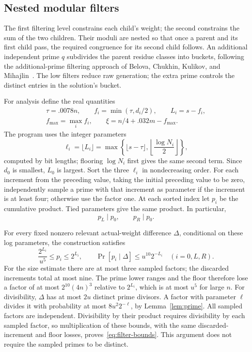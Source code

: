 \subsection{Nested modular filters}

The first filtering level constrains each child's weight; the second
constrains the sum of the two children. Their moduli are nested so that
once a parent and its first child pass, the required congruence for its
second child follows. An additional independent prime $q$ subdivides
the parent residue classes into buckets, following the additional-prime
filtering approach of Belova, Chukhin, Kulikov, and
Mihajlin~\cite[full version, Sections~1.2.3 and~4.1]{BCKM24}.
The low filters reduce raw
generation; the extra prime controls the distinct entries in the
solution's bucket.

For analysis define the real quantities
\begin{equation}\label{eq:filter-scales}
\begin{gathered}
 \tau=.0078n,\qquad f_i=\min(\tau,d_i/2),\qquad L_i=s-f_i,\\
 f_{\max}=\max_i f_i,\qquad \xi=n/4+.032m-f_{\max}.
\end{gathered}
\end{equation}
The program uses the integer parameters
\[
 \ell_i=\lfloor L_i\rfloor
 =\max\left\{\lfloor s-\tau\rfloor,
              \left\lfloor\frac{\log N_i}{2}\right\rfloor\right\},
\]
computed by bit lengths; flooring $\log N_i$ first gives the same second
term.  Since $d_0$ is smallest, $L_0$ is largest.  Sort the three
$\ell_i$ in nondecreasing order.  For each increment from the preceding
value, taking the initial preceding value to be zero, independently
sample a prime with that increment as parameter if the increment is at
least four; otherwise use the factor one.  At each sorted index let
$p_i$ be the cumulative product.  Tied parameters give the same product.
In particular,
\[
 p_L\mid p_0,\qquad p_R\mid p_0.
\]

For every fixed nonzero relevant actual-weight difference $\Delta$,
conditional on these log parameters, the construction satisfies
\begin{equation}\label{eq:filter-bounds}
 \frac{2^{L_i}}{u^5}\le p_i\le 2^{L_i},
 \qquad
 \Pr[p_i\mid\Delta]\le u^{10}2^{-L_i}
 \quad (i=0,L,R).
\end{equation}
For the size estimate there are at most three sampled factors; the
discarded increments total at most nine.  The prime lower ranges and
the floor therefore lose a factor of at most $2^{10}(4n)^3$ relative to
$2^{L_i}$, which is at most $u^5$ for large $n$.  For divisibility,
$\Delta$ has at most $2u$ distinct prime divisors.  A factor with
parameter $\ell$ divides it with probability at most
$8u^2 2^{-\ell}$, by Lemma~\ref{lem:prime}.  All sampled factors are
independent.  Divisibility by their product requires divisibility by
each sampled factor, so multiplication of these bounds, with the same
discarded-increment and floor losses, proves~\eqref{eq:filter-bounds}.
This argument does not require the sampled primes to be distinct.

